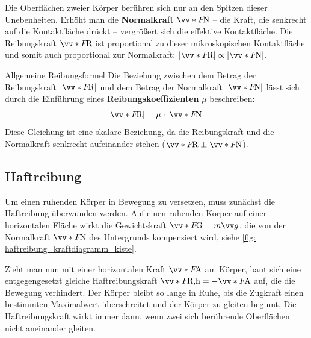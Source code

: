 Die Oberflächen zweier Körper berühren sich nur an den Spitzen dieser Unebenheiten. Erhöht man die \textbf{Normalkraft} $\ivecS{F}{\text{N}}$ – die Kraft, die senkrecht auf die Kontaktfläche drückt – vergrößert sich die effektive Kontaktfläche. Die Reibungskraft $\ivecS{F}{\text{R}}$ ist proportional zu dieser mikroskopischen Kontaktfläche und somit auch proportional zur Normalkraft: $|\ivecS{F}{\text{R}}| \propto |\ivecS{F}{\text{N}}|$.

\begin{importantbox}[]{Allgemeine Reibungsformel}
Die Beziehung zwischen dem Betrag der Reibungskraft $|\ivecS{F}{\text{R}}|$ und dem Betrag der Normalkraft $|\ivecS{F}{\text{N}}|$ lässt sich durch die Einführung eines \textbf{Reibungskoeffizienten} $\mu$ beschreiben:
\begin{equation}\label{eq: reibungskraft_FR_equal_mu_FN}
    |\ivecS{F}{\text{R}}| = \mu \cdot |\ivecS{F}{\text{N}}|
\end{equation}
Diese Gleichung ist eine skalare Beziehung, da die Reibungskraft und die Normalkraft senkrecht aufeinander stehen ($\ivecS{F}{\text{R}} \perp \ivecS{F}{\text{N}}$).
\end{importantbox}

\subsection{Haftreibung}\label{subsec: Haftreibung}
Um einen ruhenden Körper in Bewegung zu versetzen, muss zunächst die Haftreibung überwunden werden. Auf einen ruhenden Körper auf einer horizontalen Fläche wirkt die Gewichtskraft $\ivecS{F}{\text{G}} = m\ivec{g}$, die von der Normalkraft $\ivecS{F}{\text{N}}$ des Untergrunds kompensiert wird, siehe \cref{fig: haftreibung_kraftdiagramm_kiste}. 

Zieht man nun mit einer horizontalen Kraft $\ivecS{F}{\text{A}}$ am Körper, baut sich eine entgegengesetzt gleiche Haftreibungskraft $\ivecS{F}{\text{R,h}} = -\ivecS{F}{\text{A}}$ auf, die die Bewegung verhindert. Der Körper bleibt so lange in Ruhe, bis die Zugkraft einen bestimmten Maximalwert überschreitet und der Körper zu gleiten beginnt. Die Haftreibungskraft wirkt immer dann, wenn zwei sich berührende Oberflächen nicht aneinander gleiten. 

